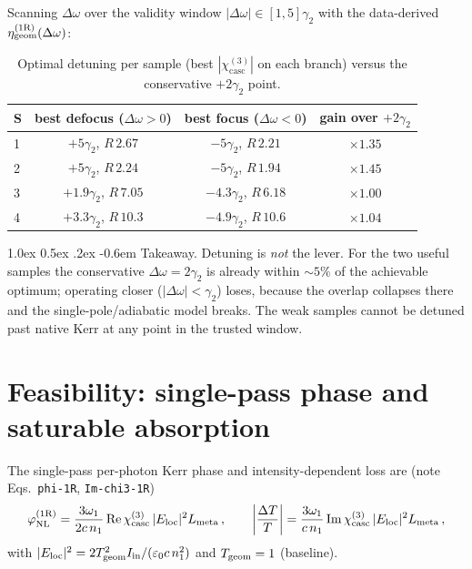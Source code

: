 \documentclass[11pt,a4paper]{article}
\makeatletter
\newcommand{\eps}{\varepsilon}
\newcommand{\chithree}{\chi^{(3)}}
\newcommand{\Dom}{\Delta\omega}
\newcommand{\geom}{{\rm geom}}
\newcommand{\chicasc}{\chithree_{\text{casc}}}
\newcommand{\etag}{\eta_{\geom}^{(1\mathrm R)}}
\newcommand{\Eloc}{E_{\text{loc}}}
\renewcommand\paragraph{%
  \@startsection{paragraph}{4}{\z@}%
                {1.0ex \@plus 0.5ex \@minus .2ex}%
                {-0.6em}%
                {\normalfont\itshape}}
\makeatother
\begin{document}
Scanning $\Dom$ over the validity window $|\Dom|\in[1,5]\gamma_2$ with the
data-derived $\etag(\Dom)$:

\begin{table}[H]
  \centering
  \caption{Optimal detuning per sample (best $|\chicasc|$ on each branch) versus
  the conservative $+2\gamma_2$ point.}
  \label{tab:optimal}
  \small
  \begin{tabular}{lccc}
    \toprule
    S & best defocus ($\Dom>0$) & best focus ($\Dom<0$) & gain over $+2\gamma_2$ \\
    \midrule
    1 & $+5\gamma_2$, $R\,2.67$   & $-5\gamma_2$, $R\,2.21$   & $\times1.35$ \\
    2 & $+5\gamma_2$, $R\,2.24$   & $-5\gamma_2$, $R\,1.94$   & $\times1.45$ \\
    3 & $+1.9\gamma_2$, $R\,7.05$ & $-4.3\gamma_2$, $R\,6.18$ & $\times1.00$ \\
    4 & $+3.3\gamma_2$, $R\,10.3$ & $-4.9\gamma_2$, $R\,10.6$ & $\times1.04$ \\
    \bottomrule
  \end{tabular}
\end{table}

\paragraph{Takeaway.}
Detuning is \emph{not} the lever. For the two useful samples the conservative
$\Dom=2\gamma_2$ is already within $\sim\!5\%$ of the achievable optimum; operating
closer ($|\Dom|<\gamma_2$) loses, because the overlap collapses there and the
single-pole/adiabatic model breaks. The weak samples cannot be detuned past native
Kerr at any point in the trusted window.

\section{Feasibility: single-pass phase and saturable absorption}
\label{sec:feasibility}

The single-pass per-photon Kerr phase and intensity-dependent loss are
(note Eqs.~\texttt{phi-1R}, \texttt{Im-chi3-1R})
\begin{equation}
  \varphi_{\rm NL}^{(1\mathrm R)} = \frac{3\omega_1}{2 c\,n_1}\,
        \mathrm{Re}\,\chicasc\,|\Eloc|^2 L_{\rm meta}\,,
  \qquad
  \left|\frac{\Delta T}{T}\right| = \frac{3\omega_1}{c\,n_1}\,
        \mathrm{Im}\,\chicasc\,|\Eloc|^2 L_{\rm meta}\,,
\end{equation}
with $|\Eloc|^2 = 2T_{\rm geom}^2 I_{\rm in}/(\eps_0 c\,n_1^2)$ and
$T_{\rm geom}=1$ (baseline).
\end{document}
